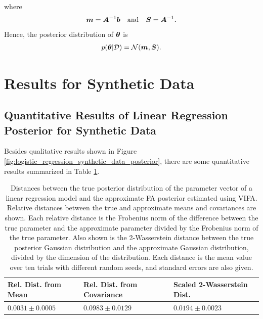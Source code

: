 \documentclass[10pt]{article} %
\begin{document}
where
\begin{equation}
	{\bm{m}} = {\bm{A}}^{-1} {\bm{b}}
	\quad \text{and} \quad 
	{\bm{S}} = {\bm{A}}^{-1}.
\end{equation}
Hence, the posterior distribution of ${\bm{\theta}}$ is 
\begin{align}
\begin{split}
	p({\bm{\theta}} | \mathcal{D}) = \mathcal{N}({\bm{m}}, {\bm{S}}).
\end{split}
\end{align}

\section{Results for Synthetic Data}

\subsection{Quantitative Results of Linear Regression Posterior for Synthetic Data}
\label{app:quantitative_results_linear_regression_posterior}
Besides qualitative results shown in Figure \ref{fig:logistic_regression_synthetic_data_posterior}, there are some quantitative results summarized in Table \ref{table:linear_regression_vi_posterior}.

\begin{table}[h!]
\caption{Distances between the true posterior distribution of the parameter vector of a linear regression model and the approximate FA posterior estimated using VIFA. Relative distances between the true and approximate means and covariances are shown. Each relative distance is the Frobenius norm of the difference between the true parameter and the approximate parameter divided by the Frobenius norm of the true parameter. Also shown is the 2-Wasserstein distance between the true posterior Gaussian distribution and the approximate Gaussian distribution, divided by the dimension of the distribution. Each distance is the mean value over ten trials with different random seeds, and standard errors are also given.}
\begin{center}
\begin{tabular}{lll}
\label{table:linear_regression_vi_posterior}
\textbf{Rel. Dist. from Mean} & \textbf{Rel. Dist. from Covariance} & \textbf{Scaled 2-Wasserstein Dist.} \\ \hline
$0.0031 \pm 0.0005$ 	& $0.0983 \pm 0.0129$ 	& $0.0194 \pm 0.0023$ \\ 
\end{tabular}
\end{center}
\end{table}
\end{document}
